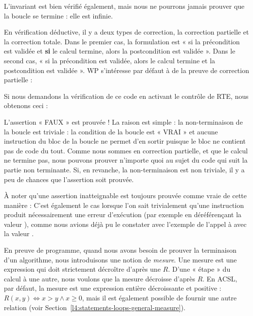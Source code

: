 L'invariant est bien vérifié également, mais nous ne pourrons jamais prouver
que la boucle se termine : elle est infinie.



\label{l3:statements-loops-variant}


En vérification déductive, il y a deux types de correction, la correction
partielle et la correction totale. Dans le premier cas, la formulation est
« si la précondition est validée et \textbf{si} le calcul termine, alors la
postcondition est validée ». Dans le second cas, « si la précondition est
validée, alors le calcul termine et la postcondition est validée ». WP
s'intéresse par défaut à de la preuve de correction partielle :





Si nous demandons la vérification de ce code en activant le contrôle de RTE,
nous obtenons ceci :





L'assertion « FAUX » est prouvée ! La raison est simple : la non-terminaison de
la boucle est triviale : la condition de la boucle est « VRAI » et aucune instruction
du bloc de la boucle ne permet d'en sortir puisque le bloc ne contient pas de code du
tout. Comme nous sommes en correction partielle, et que le calcul ne termine pas, nous
pouvons prouver n'importe quoi au sujet du code qui suit la partie non terminante. Si,
en revanche, la non-terminaison est non triviale, il y a peu de chances que l'assertion
soit prouvée.



\begin{Information}
  À noter qu'une assertion inatteignable est toujours prouvée comme vraie de
  cette manière :
  C'est également le cas lorsque l'on sait trivialement qu'une instruction
  produit nécessairement une erreur d'exécution (par exemple en déréférençant
  la valeur ), comme nous avions déjà pu le constater avec
  l'exemple de l'appel à  avec la valeur .
\end{Information}


\label{l4:statements-loops-variant-measure}


En preuve de programme, quand nous avons besoin de prouver la terminaison d'un
algorithme, nous introduisons une notion de \textit{mesure}. Une mesure est une
expression qui doit strictement décroître d'après une
$R$. D'une « étape » du calcul à une autre, nous voulons que la mesure décroisse
d'après $R$. En ACSL, par défaut, la mesure est une expression entière
décroissante et positive : $R(x,y) \Leftrightarrow x > y \wedge x \geq 0$, mais
il est également possible de fournir une autre relation (voir
Section~\ref{l4:statements-loops-general-measure}).


